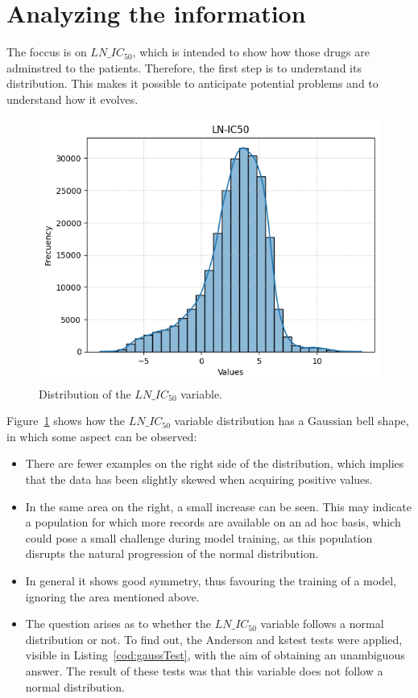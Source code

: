 \section{Analyzing the information}

The foccus is on \(LN\_IC_{50}\), which is intended to show how those drugs are adminstred to the patients. Therefore, the first step is to understand its distribution. This makes it possible to anticipate potential problems and to understand how it evolves.

\begin{figure}[H]
    \centering
    \includegraphics[width=1\textwidth]{figures/LNIC_50_barplot.png}
    \caption{Distribution of the \(LN\_IC_{50}\) variable.}
    \label{fig:lnic50_distribution}
\end{figure}

Figure~\ref{fig:lnic50_distribution} shows how the \(LN\_IC_{50}\) variable distribution has a Gaussian bell shape, in which some aspect can be observed:

\begin{itemize}
    \item There are fewer examples on the right side of the distribution, which implies that the data has been slightly skewed when acquiring positive values.
    \item In the same area on the right, a small increase can be seen. This may indicate a population for which more records are available on an ad hoc basis, which could pose a small challenge during model training, as this population disrupts the natural progression of the normal distribution.
    \item In general it shows good symmetry, thus favouring the training of a model, ignoring the area mentioned above.
    \item The question arises as to whether the \(LN\_IC_{50}\) variable follows a normal distribution or not. To find out, the Anderson and kstest tests were applied, visible in Listing~\ref{cod:gaussTest}, with the aim of obtaining an unambiguous answer. The result of these tests was that this variable does not follow a normal distribution.
\end{itemize}

